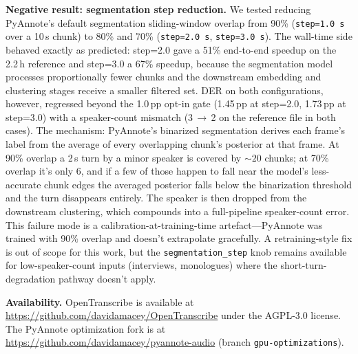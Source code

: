 \documentclass[conference,10pt]{IEEEtran}
\begin{document}
\vspace{0.5em}
\noindent\textbf{Negative result: segmentation step reduction.}\quad
We tested reducing PyAnnote's default segmentation sliding-window overlap
from 90\% (\texttt{step=1.0\,s} over a 10\,s chunk) to 80\% and 70\%
(\texttt{step=2.0\,s}, \texttt{step=3.0\,s}). The wall-time
side behaved exactly as predicted: step=2.0 gave a 51\% end-to-end speedup
on the 2.2\,h reference and step=3.0 a 67\% speedup, because the segmentation
model processes proportionally fewer chunks and the downstream embedding and
clustering stages receive a smaller filtered set. DER on both configurations,
however, regressed beyond the 1.0\,pp opt-in gate (1.45\,pp at step=2.0,
1.73\,pp at step=3.0) with a speaker-count mismatch (3\,$\to$\,2 on the
reference file in both cases). The mechanism: PyAnnote's binarized segmentation
derives each frame's label from the average of every overlapping chunk's
posterior at that frame. At 90\% overlap a 2\,s turn by a minor speaker is
covered by ${\sim}20$ chunks; at 70\% overlap it's only 6, and if a few of
those happen to fall near the model's less-accurate chunk edges the averaged
posterior falls below the binarization threshold and the turn disappears
entirely. The speaker is then dropped from the downstream clustering, which
compounds into a full-pipeline speaker-count error. This failure mode is a
calibration-at-training-time artefact---PyAnnote was trained with 90\% overlap
and doesn't extrapolate gracefully. A retraining-style fix is out of scope
for this work, but the \texttt{segmentation\_step} knob remains available
for low-speaker-count inputs (interviews, monologues) where the short-turn-
degradation pathway doesn't apply.

\vspace{0.5em}
\noindent\textbf{Availability.}\quad
OpenTranscribe is available at
\url{https://github.com/davidamacey/OpenTranscribe} under the AGPL-3.0 license.
The PyAnnote optimization fork is at
\url{https://github.com/davidamacey/pyannote-audio} (branch
\texttt{gpu-optimizations}).



\end{document}
